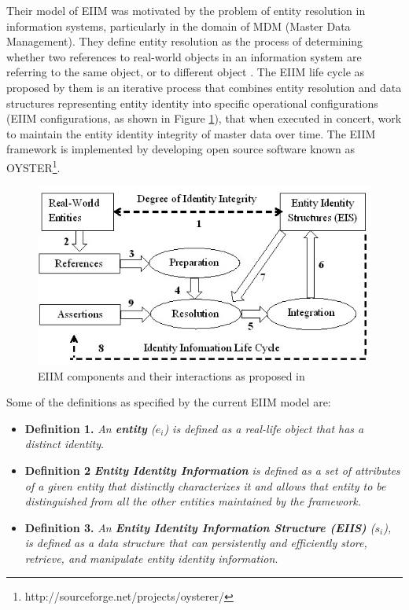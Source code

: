 Their model of EIIM was motivated by the problem of entity resolution in information systems, particularly in the domain of MDM (Master Data Management). They define entity resolution as the process of determining whether two references to real-world objects in an information system are referring to the same object, or to different object \cite{talburt2011entity}. The EIIM life cycle as proposed by them is an iterative process that combines entity resolution and data structures representing entity identity into specific operational configurations (EIIM configurations, as shown in Figure \ref{originalEIIM}), that when executed in concert, work to maintain the entity identity integrity of master data over time. The EIIM framework is implemented by developing open source software known as OYSTER\footnote{http://sourceforge.net/projects/oysterer/}.

\begin{figure}[htbp]
  \caption{EIIM components and their interactions as proposed in \cite{zhou2011entity}}
\label{originalEIIM}
  \centering
    \includegraphics[width=12cm,height=6cm]{Figures/originalEIIM.jpg}
\end{figure}

Some of the definitions as specified by the current EIIM model are:

\begin{itemize}
\item \textbf{Definition 1.} \textit{An \textbf{entity} (\textbf{$e_{i}$}) is defined as a real-life object that has a distinct identity}.

\item \textbf{Definition 2} \textit{\textbf{Entity Identity Information} is defined as a set of attributes of a given entity that distinctly characterizes it and allows that entity to be distinguished from all the other entities maintained by the framework.}

\item \textbf{Definition 3.} \textit{An \textbf{Entity Identity Information Structure (EIIS)} (\textbf{$s_{i}$}), is defined as a data structure that can persistently and efficiently store, retrieve, and manipulate entity identity information}.
\end{itemize}







